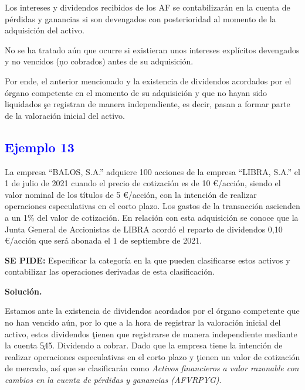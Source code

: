 Los intereses y dividendos recibidos de los AF se contabilizarán en la cuenta de pérdidas y ganancias si son devengados con posterioridad al momento de la adquisición del activo.

No se ha tratado aún que ocurre si existieran unos intereses explícitos devengados y no vencidos (\c{no cobrados}) antes de su adquisición.

Por ende, el anterior mencionado y la existencia de dividendos acordados  por el órgano competente en el momento de su adquisición y que no hayan sido liquidados \c{se registran de manera independiente, es decir, pasan a formar parte de la valoración inicial del activo.}


\subsection*{\textcolor{blue}{Ejemplo 13}}

La empresa ``BALOS, S.A.'' adquiere 100 acciones de la empresa ``LIBRA, S.A.'' el 1 de julio de 2021 cuando el precio de cotización es de 10 €/acción, siendo el valor nominal de los títulos de 5 €/acción, con la intención de realizar operaciones especulativas en el corto plazo. Los gastos de la transacción ascienden a un 1\% del valor de cotización. En relación con esta adquisición se conoce que la Junta General de Accionistas de LIBRA acordó el reparto de dividendos 0,10 €/acción que será abonada el 1 de septiembre de 2021.

\textbf{SE PIDE:} Especificar la categoría en la que pueden clasificarse estos activos y contabilizar las operaciones derivadas de esta clasificación.

\textbf{Solución.}

Estamos ante la existencia de dividendos acordados por el órgano competente que no han vencido aún, por lo que a la hora de registrar la valoración inicial del activo, estos dividendos \c{tienen que registrarse de manera independiente} mediante la cuenta \c{545. Dividendo a cobrar}.
Dado que la empresa tiene la intención de realizar operaciones especulativas en el corto plazo y \c{tienen un valor de cotización de mercado}, así que se clasificarán como \textit{Activos financieros a valor razonable con cambios en la cuenta de pérdidas y ganancias (AFVRPYG)}.

